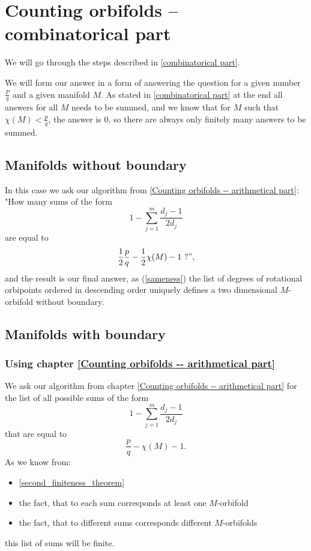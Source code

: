 \chapter{Counting orbifolds -- combinatorical part}\label{Counting orbifolds -- combinatorical part}
We will go through the steps described in \ref{combinatorical part}.

We will form our answer in a form of answering the 
question for a given number $\frac{P}{q}$ and a given manifold $M$. 
As stated in \ref{combinatorical part} at the end all answers for all $M$ needs to be summed, 
and we know that for $M$ such that $\chi(M) < \frac{p}{q}$, the answer is $0$, so there 
are always only finitely many answers to be summed. 

\section{Manifolds without boundary}
In this case we ask our algorithm from \ref{Counting orbifolds -- arithmetical part}: 
"How many sums of the form
\begin{equation}
1-\sum_{j=1}^m \frac{d_j-1}{2d_j} 
\end{equation}
are equal to 
\begin{equation}
\frac{1}{2}\frac{p}{q} - \frac{1}{2}\chi(M) -1\ ?",
\end{equation}
and the result is our final answer, as (\ref{sameness}) the list of degrees of rotational orbipoints ordered 
in descending order uniquely defines a two dimensional $M$-orbifold without boundary. 
\section{Manifolds with boundary}
\subsection{Using chapter \ref{Counting orbifolds -- arithmetical part}}\label{use algorithm step}
We ask our algorithm from chapter \ref{Counting orbifolds -- arithmetical part} for the list 
of all possible sums of the form
\begin{equation}
1-\sum_{j=1}^m \frac{d_j-1}{2d_j} 
\end{equation}
that are equal to 
\begin{equation}
\frac{p}{q} - \chi(M) - 1. 
\end{equation}
As we know from: 
\begin{itemize}
\item \ref{second_finiteness_theorem} 
\item the fact, that to each 
sum corresponds at least one $M$-orbifold
\item the fact, that to different sums corresponds different $M$-orbifolds
\end{itemize}
this list of sums will be finite. 
